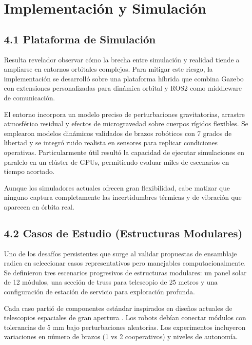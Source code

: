 \section{Implementación y Simulación}

\subsection{4.1 Plataforma de Simulación}

Resulta revelador observar cómo la brecha entre simulación y realidad tiende a ampliarse en entornos orbitales complejos. Para mitigar este riesgo, la implementación se desarrolló sobre una plataforma híbrida que combina Gazebo con extensiones personalizadas para dinámica orbital y ROS2 como middleware de comunicación.

El entorno incorpora un modelo preciso de perturbaciones gravitatorias, arrastre atmosférico residual y efectos de microgravedad sobre cuerpos rígidos flexibles. Se emplearon modelos dinámicos validados de brazos robóticos con 7 grados de libertad y se integró ruido realista en sensores para replicar condiciones operativas. Particularmente útil resultó la capacidad de ejecutar simulaciones en paralelo en un clúster de GPUs, permitiendo evaluar miles de escenarios en tiempo acortado.

Aunque los simuladores actuales ofrecen gran flexibilidad, cabe matizar que ninguno captura completamente las incertidumbres térmicas y de vibración que aparecen en órbita real.

\subsection{4.2 Casos de Estudio (Estructuras Modulares)}

Uno de los desafíos persistentes que surge al validar propuestas de ensamblaje radica en seleccionar casos representativos pero manejables computacionalmente. Se definieron tres escenarios progresivos de estructuras modulares: un panel solar de 12 módulos, una sección de truss para telescopio de 25 metros y una configuración de estación de servicio para exploración profunda.

Cada caso partió de componentes estándar inspirados en diseños actuales de telescopios espaciales de gran apertura \cite{Nair2024_RoboticTech}. Los robots debían conectar módulos con tolerancias de 5 mm bajo perturbaciones aleatorias. Los experimentos incluyeron variaciones en número de brazos (1 vs 2 cooperativos) y niveles de autonomía.

